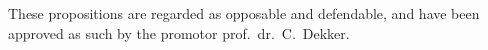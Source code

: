 \documentclass{dissertation}
\begin{document}
\bigskip
\bigskip

\begin{center}
These propositions are regarded as opposable and defendable, and have been approved as such by the promotor prof.\ dr.\ C.\ Dekker.
\end{center}

%
%
%
%
%
%
%
%
%
%
%
%
%
%
%
%
%
%
%
\end{document}
